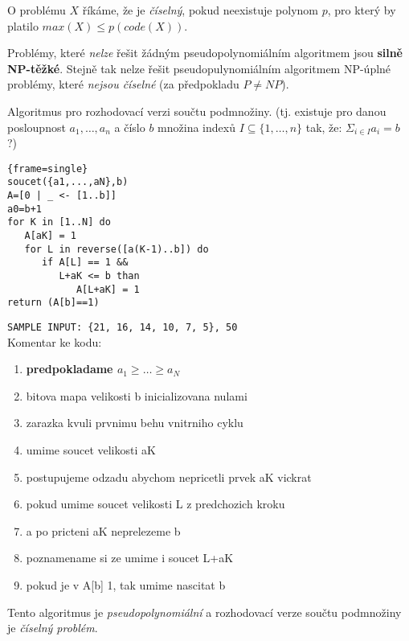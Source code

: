 \documentclass[a4paper]{article}      %
\newenvironment{definition}[1][Definice]{\begin{trivlist}
\item[\hskip \labelsep {\bfseries #1}]}{\end{trivlist}}
\newenvironment{example}[1][Příklad]{\begin{trivlist}
\item[\hskip \labelsep {\bfseries #1}]}{\end{trivlist}}
\begin{document}
\begin{definition}
O problému $X$ říkáme, že je \emph{číselný}, pokud neexistuje polynom $p$, pro který by platilo $max(X) \leq p(code(X))$.
\end{definition}

Problémy, které \emph{nelze} řešit žádným pseudopolynomiálním algoritmem jsou \textbf{silně NP-těžké}.
Stejně tak nelze řešit pseudopulynomiálním algoritmem NP-úplné problémy, které \emph{nejsou číselné} (za předpokladu $P \neq NP$).

\begin{example}
Algoritmus pro rozhodovací verzi součtu podmnožiny.
(tj. existuje pro danou posloupnost $a_1,\ldots,a_n$ a číslo $b$ množina indexů $I\subseteq \lbrace1,\ldots,n\rbrace$ tak, že:
$\Sigma_{i\in I} a_i = b$ ?)
\lstset{
	basicstyle=\small,
	stringstyle=\ttfamily,
	columns=fixed,
        numbers=left,
	basewidth=0.6em,
	breaklines=true,
	breakautoindent=true}
\begin{lstlisting}{frame=single}
soucet({a1,...,aN},b) 
A=[0 | _ <- [1..b]] 
a0=b+1              
for K in [1..N] do
   A[aK] = 1
   for L in reverse([a(K-1)..b]) do  
      if A[L] == 1 &&
         L+aK <= b than
            A[L+aK] = 1
return (A[b]==1)
\end{lstlisting}
\verb+SAMPLE INPUT: {21, 16, 14, 10, 7, 5}, 50+\\
Komentar ke kodu:
\begin{enumerate}
\item \textbf{predpokladame $a_1 \geq \ldots \geq a_N$}
\item bitova mapa velikosti b inicializovana nulami
\item zarazka kvuli prvnimu behu vnitrniho cyklu
\setcounter{enumi}{4}
\item umime soucet velikosti aK
\item postupujeme odzadu abychom nepricetli prvek aK vickrat
\item pokud umime soucet velikosti L z predchozich kroku
\item a po pricteni aK neprelezeme b
\item poznamename si ze umime i soucet L+aK
\item pokud je v A[b] 1, tak umime nascitat b
\end{enumerate}

Tento algoritmus je \emph{pseudopolynomiální} a rozhodovací verze součtu podmnožiny je \emph{číselný problém}.
\end{example}
\end{document}
